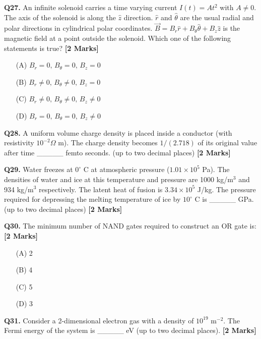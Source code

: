 \documentclass[11pt]{article}
\newcommand{\questionb}[2]{
    \noindent\textbf{Q#2.} #1 \hfill \textbf{[2 Marks]}
}
\begin{document}
\questionb{An infinite solenoid carries a time varying current \( I(t) = At^2 \) with \( A \neq 0 \). The axis of the solenoid is along the \(\hat{z}\) direction. \(\hat{r}\) and \(\hat{\theta}\) are the usual radial and polar directions in cylindrical polar coordinates. \(\vec{B} = B_r \hat{r} + B_\theta \hat{\theta} + B_z \hat{z}\) is the magnetic field at a point outside the solenoid. Which one of the following statements is true?}{27}
\begin{enumerate}
    \item[(A)] \( B_r = 0, \, B_\theta = 0, \, B_z = 0 \)
    \item[(B)] \( B_r \neq 0, \, B_\theta \neq 0, \, B_z = 0 \)
    \item[(C)] \( B_r \neq 0, \, B_\theta \neq 0, \, B_z \neq 0 \)
    \item[(D)] \( B_r = 0, \, B_\theta = 0, \, B_z \neq 0 \)
\end{enumerate}
\vspace{0.5cm}

\questionb{A uniform volume charge density is placed inside a conductor (with resistivity \(10^{-2}\Omega\) m). The charge density becomes \(1/(2.718)\) of its original value after time \_\_\_\_\_ femto seconds. (up to two decimal places)}{28}
\vspace{0.5cm}

\questionb{Water freezes at \( 0^\circ \) C at atmospheric pressure (\( 1.01 \times 10^5 \) Pa). The densities of water and ice at this temperature and pressure are 1000 kg/m\(^3\) and 934 kg/m\(^3\) respectively. The latent heat of fusion is \( 3.34 \times 10^5 \) J/kg. The pressure required for depressing the melting temperature of ice by \( 10^\circ \) C is \_\_\_\_\_ GPa. (up to two decimal places)}{29}
\vspace{0.5cm}

\questionb{The minimum number of NAND gates required to construct an OR gate is:}{30}
\begin{enumerate}
    \item[(A)] 2  
    \item[(B)] 4  
    \item[(C)] 5  
    \item[(D)] 3  
\end{enumerate}
\vspace{0.5cm}

\questionb{Consider a 2-dimensional electron gas with a density of \( 10^{19} \) m\(^{-2}\). The Fermi energy of the system is \_\_\_\_\_ eV (up to two decimal places).}{31}
\vspace{0.5cm}
\end{document}
